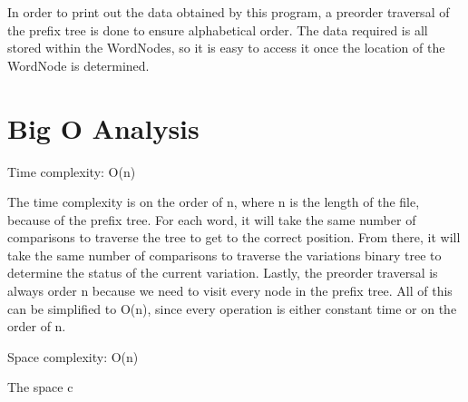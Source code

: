 \documentclass[11pt]{article}
\begin{document}
In order to print out the data obtained by this program, a preorder traversal
of the prefix tree is done to ensure alphabetical order. The data required is 
all stored within the WordNodes, so it is easy to access it once the location 
of the WordNode is determined.

\section*{Big O Analysis}

Time complexity: O(n)

The time complexity is on the order of n, where n is the length of the file,
because of the prefix tree.  For each word, it will take the same number of
comparisons to traverse the tree to get to the correct position. From there, it 
will take the same number of comparisons to traverse the variations binary tree
to determine the status of the current variation. Lastly, the preorder traversal
is always order n because we need to visit every node in the prefix tree. All
of this can be simplified to O(n), since every operation is either constant 
time or on the order of n.

Space complexity: O(n)

The space c
\end{document}

